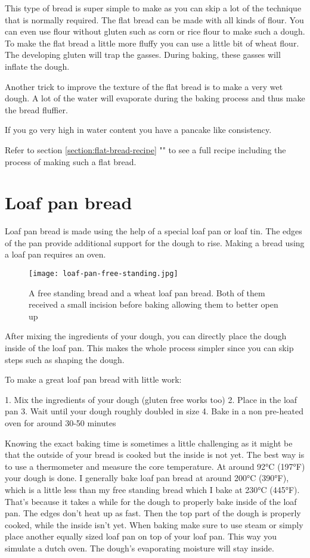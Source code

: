 This type of bread is super simple to make as you can skip
a lot of the technique that is normally required. The flat
bread can be made with all kinds of flour. You can even use
flour without gluten such as corn or rice flour to make such
a dough. To make the flat bread a little more fluffy you
can use a little bit of wheat flour. The developing gluten
will trap the gasses. During baking, these gasses will
inflate the dough.

Another trick to improve the texture of the flat bread is to
make a very wet dough. A lot of the water will evaporate
during the baking process and thus make the bread fluffier.

If you go very high in water content you have a pancake
like consistency.

Refer to section \ref{section:flat-bread-recipe} ""
to see a full recipe including the process of making such a flat bread.

\section{Loaf pan bread}

Loaf pan bread is made using the help of a special loaf pan
or loaf tin. The edges of the pan provide additional support
for the dough to rise. Making a bread using a loaf pan requires
an oven.

\begin{figure}[!htb]
  \texttt{[image: loaf-pan-free-standing.jpg]}
  \caption{A free standing bread and a wheat loaf pan bread. Both of them
  received a small incision before baking allowing them to
  better open up}
  \label{fig:free-standing-loaf-pan}
\end{figure}

After mixing the ingredients of your dough, you can directly
place the dough inside of the loaf pan. This makes the whole
process simpler since you can skip steps such as shaping the dough.

To make a great loaf pan bread with little work:

1. Mix the ingredients of your dough (gluten free works too)
2. Place in the loaf pan
3. Wait until your dough roughly doubled in size
4. Bake in a non pre-heated oven for around 30-50 minutes

Knowing the exact baking time is sometimes a little challenging
as it might be that the outside of your bread is cooked but
the inside is not yet. The best way is to use a thermometer
and measure the core temperature. At around 92°C (197°F) your
dough is done. I generally bake loaf pan bread at around 200°C (390°F),
which is a little less than my free standing bread which I bake
at 230°C (445°F). That's because it takes a while for the dough
to properly bake inside of the loaf pan. The edges don't heat up
as fast. Then the top part of the dough is properly cooked, while
the inside isn't yet. When baking make sure to use steam
or simply place another equally sized loaf pan on top
of your loaf pan. This way you simulate a dutch oven. The dough's
evaporating moisture will stay inside.

